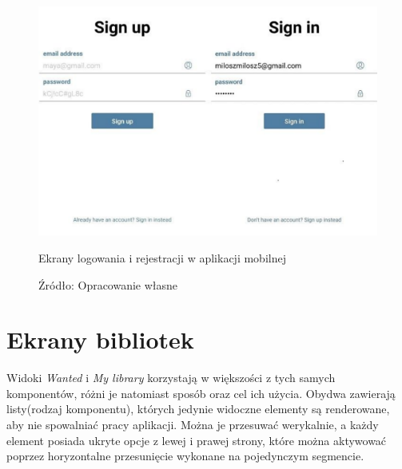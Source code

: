 \begin{figure}[H]
	\centering
	\includegraphics[width=\linewidth]{signin_signup.pdf}
	\caption{\centering Ekrany logowania i rejestracji w aplikacji mobilnej}
	\caption*{\centering Źródło: {Opracowanie własne}}
\end{figure}
\section{Ekrany bibliotek}
Widoki \textit{Wanted} i \textit{My library} korzystają w większości z tych samych komponentów, różni je natomiast sposób oraz cel ich użycia. Obydwa zawierają listy(rodzaj komponentu), których jedynie widoczne elementy są renderowane, aby nie spowalniać pracy aplikacji. Można je przesuwać werykalnie, a każdy element posiada ukryte opcje z lewej i prawej strony, które można aktywować poprzez horyzontalne przesunięcie wykonane na pojedynczym segmencie.


